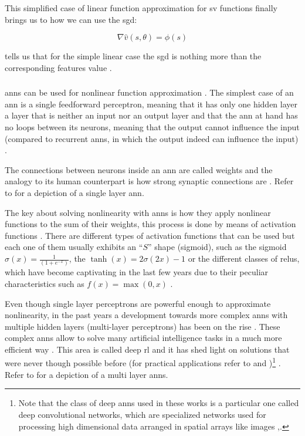 This simplified case of linear function approximation for \gls{sv} functions finally brings us to how we can use the \gls{sgd}:

\begin{equation}
\label{eq:sgd_linear}
	\nabla \hat{v} (s,\theta) = \phi (s)
\end{equation}

 tells us that for the simple linear case the \gls{sgd} is nothing more than the corresponding features value  \citep[p. 199]{Sutton2017}.

\subsubsection{}
\label{subsubsec:ann_theory}

\glspl{ann} can be used for nonlinear function approximation \citep[p. 199]{Sutton2017}. The simplest case of an \gls{ann} is a single feedforward perceptron, meaning that it has only one hidden layer \ie a layer that is neither an input nor an output layer and that the \gls{ann} at hand has no loops between its neurons, meaning that the output cannot influence the input (compared to recurrent \glspl{ann}, in which the output indeed can influence the input) \citep[p. 216]{Sutton2017}. 

The connections between neurons inside an \gls{ann} are called weights and the analogy to its human counterpart is how strong synaptic connections are \citep[p. 216]{Sutton2017}. Refer to  for a depiction of a single layer \gls{ann}.

The key about solving nonlinearity with \glspl{ann} is how they apply nonlinear functions to the sum of their weights, this process is done by means of activation functions \citep[p. 216]{Sutton2017}. There are different types of activation functions that can be used but each one of them usually exhibits an ``$S$'' shape (\ie sigmoid), such as the sigmoid $\sigma(x) = \frac{1}{(1+e^{-x})}$, the $\tanh(x) = 2\sigma(2x)-1$ or the different classes of \glspl{relu}, which have become captivating in the last few years due to their peculiar characteristics such as $f(x) = \max(0,x)$ \citep[p. 216]{Sutton2017}.

Even though single layer perceptrons are powerful enough to approximate nonlinearity, in the past years a development towards more complex \glspl{ann} with multiple hidden layers (\ie multi-layer perceptrons) has been on the rise \citep[p. 217]{Sutton2017}. These complex \glspl{ann} allow to solve many artificial intelligence tasks in a much more efficient way \citep{Bengio2009}. This area is called deep \gls{rl} and it has shed light on solutions that were never though possible before (for practical applications refer to \citet{Mnih2015} and \citet{Silver2016})\footnote{Note that the class of deep \glspl{ann} used in these works is a particular one called deep convolutional networks, which are specialized networks used for processing high dimensional data arranged in spatial arrays like images \citep[p. 219]{Sutton2017},\citep{Lecun1998}.} \citep{Bengio2009}. Refer to  for a depiction of a multi layer \glspl{ann}.


